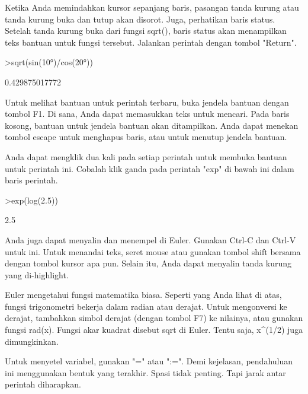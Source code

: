 \begin{eulernotebook}
\begin{eulercomment}
Ketika Anda memindahkan kursor sepanjang baris, pasangan tanda kurung
atau tanda kurung buka dan tutup akan disorot. Juga, perhatikan baris
status. Setelah tanda kurung buka dari fungsi sqrt(), baris status
akan menampilkan teks bantuan untuk fungsi tersebut. Jalankan perintah
dengan tombol "Return".
\end{eulercomment}
\begin{eulerprompt}
>sqrt(sin(10°)/cos(20°))
\end{eulerprompt}
\begin{euleroutput}
  0.429875017772
\end{euleroutput}
\begin{eulercomment}
Untuk melihat bantuan untuk perintah terbaru, buka jendela bantuan
dengan tombol F1. Di sana, Anda dapat memasukkan teks untuk mencari.
Pada baris kosong, bantuan untuk jendela bantuan akan ditampilkan.
Anda dapat menekan tombol escape untuk menghapus baris, atau untuk
menutup jendela bantuan.

Anda dapat mengklik dua kali pada setiap perintah untuk membuka
bantuan untuk perintah ini. Cobalah klik ganda pada perintah "exp" di
bawah ini dalam baris perintah.
\end{eulercomment}
\begin{eulerprompt}
>exp(log(2.5))
\end{eulerprompt}
\begin{euleroutput}
  2.5
\end{euleroutput}
\begin{eulercomment}
Anda juga dapat menyalin dan menempel di Euler. Gunakan Ctrl-C dan
Ctrl-V untuk ini. Untuk menandai teks, seret mouse atau gunakan tombol
shift bersama dengan tombol kursor apa pun. Selain itu, Anda dapat
menyalin tanda kurung yang di-highlight.
\end{eulercomment}
\begin{eulercomment}

\end{eulercomment}
\begin{eulercomment}
Euler mengetahui fungsi matematika biasa. Seperti yang Anda lihat di
atas, fungsi trigonometri bekerja dalam radian atau derajat. Untuk
mengonversi ke derajat, tambahkan simbol derajat (dengan tombol F7) ke
nilainya, atau gunakan fungsi rad(x). Fungsi akar kuadrat disebut sqrt
di Euler. Tentu saja, x\textasciicircum{}(1/2) juga dimungkinkan.

Untuk menyetel variabel, gunakan "=" atau ":=". Demi kejelasan,
pendahuluan ini menggunakan bentuk yang terakhir. Spasi tidak penting.
Tapi jarak antar perintah diharapkan.


\end{eulercomment}
\end{eulernotebook}
